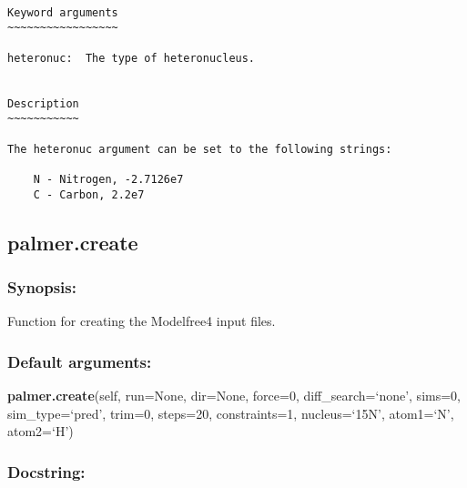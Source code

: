 {\scriptsize
\begin{verbatim}

Keyword arguments
~~~~~~~~~~~~~~~~~

heteronuc:  The type of heteronucleus.


Description
~~~~~~~~~~~

The heteronuc argument can be set to the following strings:

    N - Nitrogen, -2.7126e7
    C - Carbon, 2.2e7
\end{verbatim}
}



\newpage

\subsection{palmer.create}


\subsubsection{Synopsis:}

Function for creating the Modelfree4 input files.

\subsubsection{Default arguments:}

\textsf{\textbf{palmer.create}(self, run=None, dir=None, force=0, diff\_search=`none', sims=0, sim\_type=`pred', trim=0, steps=20, constraints=1, nucleus=`15N', atom1=`N', atom2=`H')
}


\subsubsection{Docstring:}

